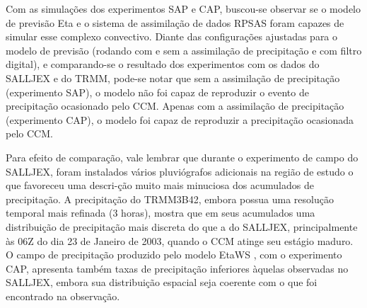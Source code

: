 Com as simulações dos experimentos SAP e CAP, buscou-se observar se o modelo de previsão Eta e o sistema de assimilação de dados RPSAS foram capazes de simular esse complexo convectivo. Diante das configurações ajustadas para o modelo de previsão (rodando com e sem a assimilação de precipitação e com filtro digital), e comparando-se o resultado dos experimentos com os dados do SALLJEX e do TRMM, pode-se notar que sem a assimilação de precipitação (experimento SAP), o modelo não foi capaz de reproduzir o evento de precipitação ocasionado pelo CCM. Apenas com a assimilação de precipitação (experimento CAP), o modelo foi capaz de reproduzir a precipitação ocasionada pelo CCM.

Para efeito de comparação, vale lembrar que durante o experimento de campo do SALLJEX, foram instalados vários pluviógrafos adicionais na região de estudo o que favoreceu uma descri-ção muito mais minuciosa dos acumulados de precipitação. A precipitação do TRMM3B42, embora possua uma resolução temporal mais refinada (3 horas), mostra que em seus acumulados uma distribuição de precipitação mais discreta do que a do SALLJEX, principalmente às 06Z do dia 23 de Janeiro de 2003, quando o CCM atinge seu estágio maduro. O campo de precipitação produzido pelo modelo EtaWS , com o experimento CAP, apresenta também taxas de precipitação inferiores àquelas observadas no SALLJEX, embora sua distribuição espacial seja coerente com o que foi encontrado na observação.

